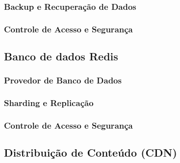 \subsubsection{Backup e Recuperação de Dados}

\subsubsection{Controle de Acesso e Segurança}

\subsection{Banco de dados Redis}

\subsubsection{Provedor de Banco de Dados}

\subsubsection{Sharding e Replicação}

\subsubsection{Controle de Acesso e Segurança}



\subsection{Distribuição de Conteúdo (CDN)}

